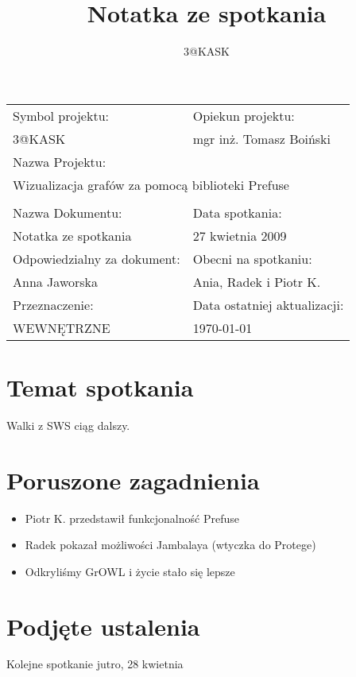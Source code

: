 \documentclass[a4paper,10pt]{article}
\title{Notatka ze spotkania}
\author{3@KASK}
\begin{document}



\maketitle


\begin{center}
\begin{tabular}{|p{7cm}|p{7cm}|}
\hline
Symbol projektu: & Opiekun projektu:   \tabularnewline 
3@KASK & mgr inż. Tomasz Boiński    \tabularnewline \hline
\multicolumn{2}{|l|}{Nazwa Projektu: } \tabularnewline
\multicolumn{2}{|l|}{Wizualizacja grafów za pomocą biblioteki Prefuse } \tabularnewline 
\hline
\multicolumn{2}{l}{ } \tabularnewline %
\hline 
Nazwa Dokumentu: & Data spotkania:   \tabularnewline 
Notatka ze spotkania & 27 kwietnia 2009 \tabularnewline \hline
Odpowiedzialny za dokument: & Obecni na spotkaniu:   \tabularnewline 
Anna Jaworska & Ania, Radek i Piotr K.  \tabularnewline \hline
Przeznaczenie: & Data ostatniej aktualizacji:   \tabularnewline 
WEWNĘTRZNE & \today \tabularnewline \hline
\end{tabular}
\end{center}



\section{Temat spotkania}
Walki z SWS ciąg dalszy.

\section{Poruszone zagadnienia}
\begin{itemize}
 \item Piotr K. przedstawił funkcjonalność Prefuse
 \item Radek pokazał możliwości Jambalaya (wtyczka do Protege)
 \item Odkryliśmy GrOWL i życie stało się lepsze
\end{itemize}



\section{Podjęte ustalenia}
Kolejne spotkanie jutro, 28 kwietnia
\end{document}
